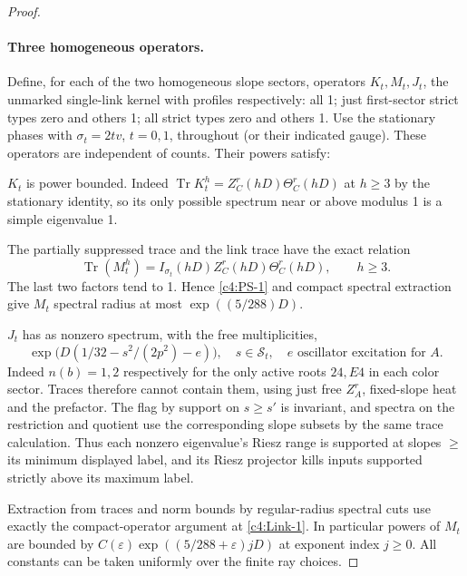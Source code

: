 \begin{proof}
\paragraph{Three homogeneous operators.}
Define, for each of the two homogeneous slope sectors, operators \(K_t,M_t,J_t\), the unmarked single-link kernel with profiles respectively: all 1; just first-sector strict types zero and others 1; all strict types zero and others 1. Use the stationary phases with \(\sigma_t=2tv\), \(t=0,1\), throughout (or their indicated gauge). These operators are independent of counts. Their powers satisfy:
\par\noindent\textbullet\quad \(K_t\) is power bounded. Indeed \(\operatorname{Tr}K_t^h=Z_C^r(hD)\Theta_C^r(hD)\) at \(h\ge3\) by the stationary identity, so its only possible spectrum near or above modulus 1 is a simple eigenvalue 1.
\par\noindent\textbullet\quad The partially suppressed trace and the link trace have the exact relation
\[
 \operatorname{Tr}(M_t^h)
    = I_{\sigma_t}(hD)Z_C^r(hD)\Theta_C^r(hD),\qquad h\ge3.
\]
The last two factors tend to 1. Hence \eqref{c4:PS-1} and compact
spectral extraction give \(M_t\) spectral radius at most
\(\exp((5/288)D)\).
\par\noindent\textbullet\quad \(J_t\) has as nonzero spectrum, with the free multiplicities,
\[
                \exp\big(D(1/32-s^2/(2p^2)-e)\big),\quad s\in\mathcal S_t,\quad
                e\text{ oscillator excitation for }A .
\]
Indeed \(n(b)=1,2\) respectively for the only active roots \(24,E4\) in each color sector. Traces therefore cannot contain them, using just free \(Z_A^r\), fixed-slope heat and the prefactor. The flag by support on \(s\ge s'\) is invariant, and spectra on the restriction and quotient use the corresponding slope subsets by the same trace calculation. Thus each nonzero eigenvalue's Riesz range is supported at slopes \(\ge\) its minimum displayed label, and its Riesz projector kills inputs supported strictly above its maximum label.

Extraction from traces and norm bounds by regular-radius spectral cuts use exactly the compact-operator argument at \eqref{c4:Link-1}. In particular powers of \(M_t\) are bounded by \(C(\varepsilon)\exp((5/288+\varepsilon)jD)\) at exponent index \(j\ge0\). All constants can be taken uniformly over the finite ray choices.


\end{proof}
